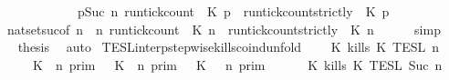\begin{isabellebody}
\ \ \ \ \ \ \ \ \ {\isasyminter}\ {\isacharbraceleft}\ {\isasymrho}{\isachardot}\ {\isasymforall}p{\isasymge}Suc\ n{\isachardot}\ {\isacharparenleft}run{\isacharunderscore}tick{\isacharunderscore}count\ {\isasymrho}\ K\ p{\isacharparenright}\ {\isasymle}\ {\isacharparenleft}run{\isacharunderscore}tick{\isacharunderscore}count{\isacharunderscore}strictly\ {\isasymrho}\ K\ p{\isacharparenright}\ {\isacharbraceright}{\isacartoucheclose}\isanewline
\ \ \ \ \isamarkupfalse%
\ nat{\isacharunderscore}set{\isacharunderscore}suc{\isacharbrackleft}of\ {\isacartoucheopen}n{\isacartoucheclose}\ {\isacartoucheopen}{\isasymlambda}{\isasymrho}\ n{\isachardot}\ {\isacharparenleft}run{\isacharunderscore}tick{\isacharunderscore}count\ {\isasymrho}\ K\ n{\isacharparenright}\ {\isasymle}\ {\isacharparenleft}run{\isacharunderscore}tick{\isacharunderscore}count{\isacharunderscore}strictly\ {\isasymrho}\ K\ n{\isacharparenright}{\isacartoucheclose}{\isacharbrackright}\isanewline
\ \ \ \ \isamarkupfalse%
\ simp\isanewline
\ \ \isamarkupfalse%
\ \isamarkupfalse%
\ {\isacharquery}thesis\ \isamarkupfalse%
\ auto\isanewline
{}\isamarkupfalse%
%
\endisatagproof
{\isafoldproof}%
%
\isadelimproof
\isanewline
%
\endisadelimproof
\isanewline
{}\isamarkupfalse%
\ TESL{\isacharunderscore}interp{\isacharunderscore}stepwise{\isacharunderscore}kills{\isacharunderscore}coind{\isacharunderscore}unfold{\isacharcolon}\isanewline
\ \ \ {\isacartoucheopen}{\isasymlbrakk}\ K\ kills\ K\ {\isasymrbrakk}\isactrlsub T\isactrlsub E\isactrlsub S\isactrlsub L\isactrlbsup {\isasymge}\ n\isactrlesup \ {\isacharequal}\isanewline
\ \ \ \ {\isacharparenleft}{\isasymlbrakk}\ K\ {\isasymnot}{\isasymUp}\ n\ {\isasymrbrakk}\isactrlsub p\isactrlsub r\isactrlsub i\isactrlsub m\ {\isasymunion}\ {\isasymlbrakk}\ K\ {\isasymUp}\ n\ {\isasymrbrakk}\isactrlsub p\isactrlsub r\isactrlsub i\isactrlsub m\ {\isasyminter}\ {\isasymlbrakk}\ K\ {\isasymnot}{\isasymUp}\ {\isasymge}\ n\ {\isasymrbrakk}\isactrlsub p\isactrlsub r\isactrlsub i\isactrlsub m{\isacharparenright}\isanewline
\ \ \ \ {\isasyminter}\ {\isasymlbrakk}\ K\ kills\ K\ {\isasymrbrakk}\isactrlsub T\isactrlsub E\isactrlsub S\isactrlsub L\isactrlbsup {\isasymge}\ Suc\ n\isactrlesup {\isacartoucheclose}\isanewline

\end{isabellebody}

